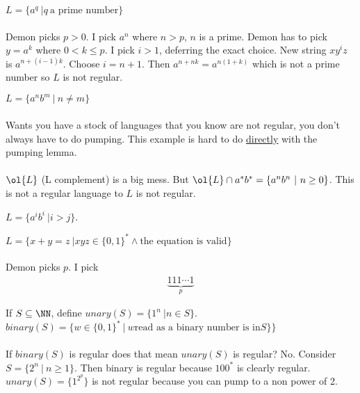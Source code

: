 \documentclass[../598comp.tex]{subfiles}
\begin{document}
\begin{example}
  $L = \{a^q \ | q \ \text{a prime number}\}$
  \\\\
  Demon picks $p > 0$. I pick $a^n$ where $n > p$, $n$ is a prime. Demon has to
  pick $y = a^k$ where $0 < k \leq p$. I pick $i > 1$, deferring the exact
  choice. New string $xy^iz$ is $a^{n + (i - 1)k}$. Choose $i = n + 1$. Then $a^{n + nk} =
  a^{n(1 + k)}$ which is not a prime number so $L$ is not regular.
\end{example}

\begin{example}
  $L = \{a^nb^m \ | \ n \neq m\}$  %
  \\\\
  Wants you have a stock of languages that you know are not regular, you don't
  always have to do pumping. This example is hard to do \ul{directly} with the
  pumping lemma.
  \\\\
  $\ol{L}$ (L complement) is a big mess. But $\ol{L} \cap a^*b^* = \{a^nb^n \ |
  \ n \geq 0\}$. This is not a regular language to $L$ is not regular.
\end{example}

\begin{example}
  $L = \{a^ib^i \ | i > j\}$.
\end{example}

\begin{example}
  $L = \{x + y = z \ | xyz \in \{0, 1\}^* \wedge \text{the equation is valid} \}$
  \\\\
  Demon picks $p$. I pick
  \begin{gather*} %
    \underbrace{111 \cdots 1}_p
  \end{gather*}
\end{example}

\begin{definition}
  If $S \subseteq \NN$, define $unary(S) = \{1^n \ | n \in S\}$. $binary(S) = \{w \in \{0, 1\}^* \ | \
  w \text{read as a binary number is in} S\}\}$
  \\\\
  If $binary(S)$ is regular does that mean $unary(S)$ is regular? No. Consider
  $S = \{2^n \ | \ n \geq 1\}$. Then binary is regular because $100^*$ is
  clearly regular. $unary(S) = \{1^{2^p}\}$ is not regular because you can pump
  to a non power of 2.
\end{definition}
\end{document}
